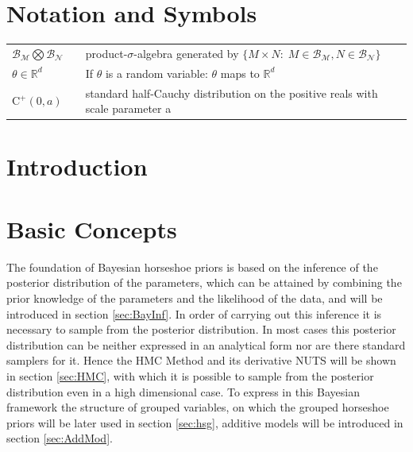 \documentclass[12pt,letterpaper]{article}
\numberwithin{equation}{subsection}
\begin{document}
\newpage
\setcounter{page}{1}
\tableofcontents
\newpage


\pagestyle{fancy}
\fancyhf{}
\fancyhead[R]{\thepage}
\renewcommand{\headrulewidth}{0pt} 
\section*{Notation and Symbols}

\begin{tabular}{lll}
$\mathcal{B}_\mathcal{M}\bigotimes\mathcal{B}_\mathcal{N}$ & & product-$\sigma$-algebra generated by $\{M\times N :\; M\in\mathcal{B}_\mathcal{M}, N\in\mathcal{B}_\mathcal{N} \}$ \\
$\theta \in \mathbb{R}^d$ & & If $\theta$ is a random variable: $\theta$ maps to $\mathbb{R}^d$ \\
$\text{C}^+(0,a)$ & & standard half-Cauchy distribution on the positive reals with scale parameter a
\end{tabular}

\pagebreak
\section{Introduction}
\pagebreak

\section{Basic Concepts}
The foundation of Bayesian horseshoe priors is based on the inference of the posterior distribution of the parameters, which can be attained by combining the prior knowledge of the parameters and the likelihood of the data, and will be introduced in section \ref{sec:BayInf}. In order of carrying out this inference it is necessary to sample from the posterior distribution.
In most cases this posterior distribution can be neither expressed in an analytical form nor are there standard samplers for it. Hence the HMC Method and its derivative NUTS will be shown in section \ref{sec:HMC}, with which it is possible to sample from the posterior distribution even in a high dimensional case. To express in this Bayesian framework the structure of grouped variables, on which the grouped horseshoe priors will be later used in section \ref{sec:hsg},  additive models will be introduced in section \ref{sec:AddMod}.
\end{document}
